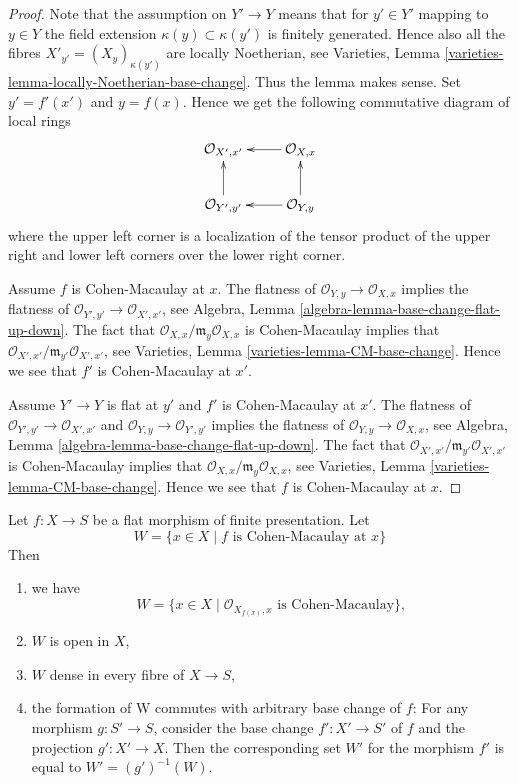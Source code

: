 \begin{proof}
Note that the assumption on $Y' \to Y$ means that for $y' \in Y'$
mapping to $y \in Y$ the field extension $\kappa(y) \subset \kappa(y')$
is finitely generated. Hence also all the fibres
$X'_{y'} = (X_y)_{\kappa(y')}$ are locally Noetherian, see
Varieties, Lemma \ref{varieties-lemma-locally-Noetherian-base-change}.
Thus the lemma makes sense. Set $y' = f'(x')$ and $y = f(x)$.
Hence we get the following commutative diagram of local rings
$$
\xymatrix{
\mathcal{O}_{X', x'} & \mathcal{O}_{X, x} \ar[l] \\
\mathcal{O}_{Y', y'} \ar[u] & \mathcal{O}_{Y, y} \ar[l] \ar[u]
}
$$
where the upper left corner is a localization of the tensor product
of the upper right and lower left corners over the lower right corner.

\medskip\noindent
Assume $f$ is Cohen-Macaulay at $x$.
The flatness of $\mathcal{O}_{Y, y} \to \mathcal{O}_{X, x}$
implies the flatness of $\mathcal{O}_{Y', y'} \to \mathcal{O}_{X', x'}$, see
Algebra, Lemma \ref{algebra-lemma-base-change-flat-up-down}.
The fact that $\mathcal{O}_{X, x}/\mathfrak m_y\mathcal{O}_{X, x}$
is Cohen-Macaulay implies that
$\mathcal{O}_{X', x'}/\mathfrak m_{y'}\mathcal{O}_{X', x'}$, see
Varieties, Lemma \ref{varieties-lemma-CM-base-change}. Hence we see that $f'$
is Cohen-Macaulay at $x'$.

\medskip\noindent
Assume $Y' \to Y$ is flat at $y'$ and $f'$ is Cohen-Macaulay at
$x'$. The flatness of $\mathcal{O}_{Y', y'} \to \mathcal{O}_{X', x'}$
and $\mathcal{O}_{Y, y} \to \mathcal{O}_{Y', y'}$ implies the flatness
of $\mathcal{O}_{Y, y} \to \mathcal{O}_{X, x}$, see
Algebra, Lemma \ref{algebra-lemma-base-change-flat-up-down}.
The fact that $\mathcal{O}_{X', x'}/\mathfrak m_{y'}\mathcal{O}_{X', x'}$
is Cohen-Macaulay implies that
$\mathcal{O}_{X, x}/\mathfrak m_y\mathcal{O}_{X, x}$, see
Varieties, Lemma \ref{varieties-lemma-CM-base-change}. Hence we see that $f$
is Cohen-Macaulay at $x$.
\end{proof}

\begin{lemma}
\label{lemma-flat-finite-presentation-CM-open}
Let $f : X \to S$ be a flat morphism of finite presentation.
Let
$$
W = \{x \in X \mid f\text{ is Cohen-Macaulay at }x\}
$$
Then
\begin{enumerate}
\item we have
$$
W = \{x \in X \mid \mathcal{O}_{X_{f(x)}, x}\text{ is Cohen-Macaulay}\},
$$
\item $W$ is open in $X$,
\item $W$ dense in every fibre of $X \to S$,
\item the formation of W commutes with arbitrary base change of $f$:
For any morphism $g : S' \to S$, consider
the base change $f' : X' \to S'$ of $f$ and the
projection $g' : X' \to X$. Then the corresponding
set $W'$ for the morphism $f'$ is equal to $W' = (g')^{-1}(W)$.
\end{enumerate}
\end{lemma}

